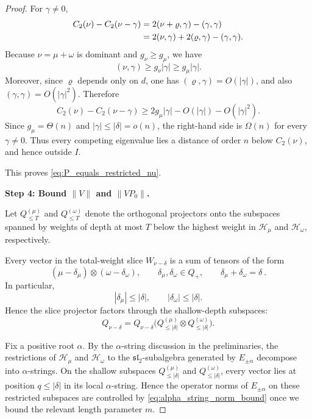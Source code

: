 \documentclass[a4paper,onecolumn,11pt]{quantumarticle}
\begin{document}
\begin{proof}
For \(\gamma\neq 0\),
\begin{align}
    C_2(\nu)-C_2(\nu-\gamma)
    &=
    2(\nu+\varrho,\gamma)-(\gamma,\gamma)\notag\\
    &=
    2(\nu,\gamma)+2(\varrho,\gamma)-(\gamma,\gamma).
\end{align}
Because \(\nu=\mu+\omega\) is dominant and \(g_\nu\ge g_\mu\), we have
\[
(\nu,\gamma)\ge g_\nu |\gamma|\ge g_\mu |\gamma|.
\]
Moreover, since \(\varrho\) depends only on \(d\), one has \((\varrho,\gamma)=O(|\gamma|)\), and also \((\gamma,\gamma)=O(|\gamma|^2)\). Therefore
\begin{equation}
    C_2(\nu)-C_2(\nu-\gamma)
    \ge
    2g_\mu |\gamma| - O(|\gamma|)-O(|\gamma|^2).
\end{equation}
Since \(g_\mu=\Theta(n)\) and \(|\gamma|\le |\delta|=o(n)\), the right-hand side is \(\Omega(n)\) for every \(\gamma\neq 0\). Thus every competing eigenvalue lies a distance of order \(n\) below \(C_2(\nu)\), and hence outside \(I\).

This proves \eqref{eq:P_equals_restricted_nu}.

\medskip
\noindent\textbf{Step 4: Bound \(\|V\|\) and \(\|VP_0\|\).}

Let \(Q_{\le T}^{(\mu)}\) and \(Q_{\le T}^{(\omega)}\) denote the orthogonal projectors onto the subspaces spanned by weights of depth at most \(T\) below the highest weight in \(\mathcal H_\mu\) and \(\mathcal H_\omega\), respectively.

Every vector in the total-weight slice \(W_{\nu-\delta}\) is a sum of tensors of the form
\[
(\mu-\delta_\mu)\otimes(\omega-\delta_\omega),
\qquad
\delta_\mu,\delta_\omega\in Q_+,
\qquad
\delta_\mu+\delta_\omega=\delta\ .
\]
In particular,
\[
|\delta_\mu|\le |\delta|,
\qquad
|\delta_\omega|\le |\delta|.
\]
Hence the slice projector factors through the shallow-depth subspaces:
\begin{equation}\label{eq:Q_depth_factorization}
    Q_{\nu-\delta}
    =
    Q_{\nu-\delta}\bigl(Q_{\le |\delta|}^{(\mu)}\otimes Q_{\le |\delta|}^{(\omega)}\bigr).
\end{equation}

Fix a positive root \(\alpha\). By the \(\alpha\)-string discussion in the preliminaries, the restrictions of \(\mathcal H_\mu\) and \(\mathcal H_\omega\) to the \(\mathfrak{sl}_2\)-subalgebra generated by \(E_{\pm\alpha}\) decompose into \(\alpha\)-strings. On the shallow subspaces \(Q_{\le |\delta|}^{(\mu)}\) and \(Q_{\le |\delta|}^{(\omega)}\), every vector lies at position \(q\le |\delta|\) in its local \(\alpha\)-string. Hence the operator norms of \(E_{\pm\alpha}\) on these restricted subspaces are controlled by \eqref{eq:alpha_string_norm_bound} once we bound the relevant length parameter \(m\).


\end{proof}
\end{document}
